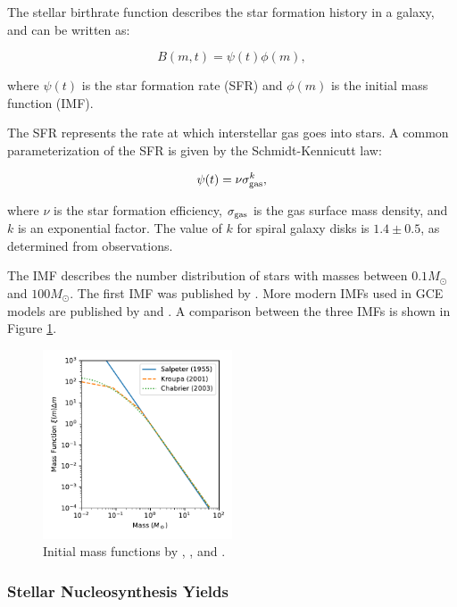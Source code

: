 \documentclass{brandeis-thesis3.2}
\def \msun {M_{\odot}}
\begin{document}
The stellar birthrate function describes the star formation history in a galaxy, and can be written as:

\begin{equation}
B(m, t) = \psi (t) \phi(m),
\end{equation}

where $\psi (t)$ is the star formation rate (SFR) and $\phi (m)$ is the initial mass function (IMF).

The SFR represents the rate at which interstellar gas goes into stars. A common parameterization of the SFR is given by the Schmidt-Kennicutt law:

\begin{equation}
\psi (t) = \nu \sigma_{\rm gas}^{k},
\end{equation}

where $\nu$ is the star formation efficiency, $\sigma_{\rm gas}$ is the gas surface mass density, and $k$ is an exponential factor. The value of $k$ for spiral galaxy disks is $1.4\pm 0.5$, as determined from observations.

The IMF describes the number distribution of stars with masses between $0.1 \msun$ and $100 \msun$. The first IMF was published by \cite{salpeter55}. More modern IMFs used in GCE models are published by \cite{kroupa01} and \cite{chabrier03}. A comparison between the three IMFs is shown in Figure \ref{fig:imf}.

\begin{figure}
\centering
\includegraphics[width = 0.5\textwidth]{figs/imf.pdf}
\caption{Initial mass functions by \cite{salpeter55}, \cite{kroupa01}, and \cite{chabrier03}.}
\label{fig:imf}
\end{figure}

\subsubsection{Stellar Nucleosynthesis Yields}
\end{document}
